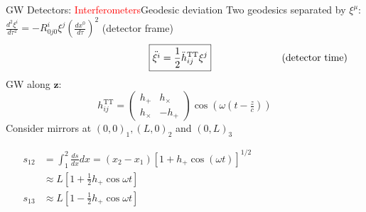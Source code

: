 \documentclass[xcolor=dvipsnames,t]{beamer}
\newcommand{\todo}[1]{\textcolor{orange}{\texttt{TODO: #1}}}
\newcommand{\red}[1]{\textcolor{red}{#1}}
\begin{document}
 \begin{frame}{GW Detectors: \red{Interferometers}}{Geodesic deviation}
    Two geodesics separated by $\xi^\mu$:
    $ \tfrac{d^2 \xi^i}{d\tau^2} = -R^i_{0j0} \xi^j\left(\tfrac{dx^0}{d\tau}\right)^2$ \hfill (detector frame)\\
    \vspace{-3mm}
    \[
    \hspace{4.5cm} \boxed{\ddot{\xi^i} = \frac{1}{2} \ddot{h}_{ij}^\text{TT} \xi^j} \hspace{2.5cm} \text{(detector time)}
    \]
    GW along $\mathbf{z}$: 
      \[
      h_{ij}^\text{TT} = \left(\begin{array}{cc}
				h_+ & h_\times \\
				h_\times & - h_+
				\end{array}\right) \cos\left(\omega\left( t-\tfrac{z}{c}\right)\right)
      \]
      Consider mirrors at $(0,0)_1, (L,0)_2$ and $(0,L)_3$
      \begin{small}
      \begin{align*}
	s_{12} &= \int_1^2 \tfrac{ds}{dx}dx = (x_2-x_1) \left[ 1 + h_+ \cos(\omega t)\right]^{1/2}\hspace{4cm} \\
				    & \approx L \left[ 1+\tfrac{1}{2} h_+ \cos\omega t \right] \\
      s_{13} &\approx L \left[ 1-\tfrac{1}{2} h_+ \cos\omega t \right]
      \end{align*}
      \end{small}
 \end{frame}
 
 
\end{document}
